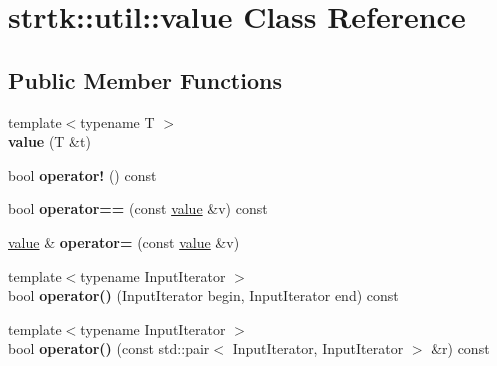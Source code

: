 \hypertarget{classstrtk_1_1util_1_1value}{\section{strtk\-:\-:util\-:\-:value Class Reference}
\label{classstrtk_1_1util_1_1value}
}
\subsection*{Public Member Functions}
\begin{DoxyCompactItemize}
\item 
\hypertarget{classstrtk_1_1util_1_1value_aac3439c6aac530d2678c2c5b251bed77}{{\footnotesize template$<$typename T $>$ }\\{\bfseries value} (T \&t)}\label{classstrtk_1_1util_1_1value_aac3439c6aac530d2678c2c5b251bed77}

\item 
\hypertarget{classstrtk_1_1util_1_1value_ad161a80cc18c6b1413118c459f43dc67}{bool {\bfseries operator!} () const }\label{classstrtk_1_1util_1_1value_ad161a80cc18c6b1413118c459f43dc67}

\item 
\hypertarget{classstrtk_1_1util_1_1value_a380152f1c6ad8790c7996181e52ed8dc}{bool {\bfseries operator==} (const \hyperlink{classstrtk_1_1util_1_1value}{value} \&v) const }\label{classstrtk_1_1util_1_1value_a380152f1c6ad8790c7996181e52ed8dc}

\item 
\hypertarget{classstrtk_1_1util_1_1value_ab0ca2a6e48dfdb638cbbc6bbb9b5e009}{\hyperlink{classstrtk_1_1util_1_1value}{value} \& {\bfseries operator=} (const \hyperlink{classstrtk_1_1util_1_1value}{value} \&v)}\label{classstrtk_1_1util_1_1value_ab0ca2a6e48dfdb638cbbc6bbb9b5e009}

\item 
\hypertarget{classstrtk_1_1util_1_1value_a05359a3121627ef019682b620e3ad5f2}{{\footnotesize template$<$typename Input\-Iterator $>$ }\\bool {\bfseries operator()} (Input\-Iterator begin, Input\-Iterator end) const }\label{classstrtk_1_1util_1_1value_a05359a3121627ef019682b620e3ad5f2}

\item 
\hypertarget{classstrtk_1_1util_1_1value_a096010cbccd86b6f9169285b70469db3}{{\footnotesize template$<$typename Input\-Iterator $>$ }\\bool {\bfseries operator()} (const std\-::pair$<$ Input\-Iterator, Input\-Iterator $>$ \&r) const }\label{classstrtk_1_1util_1_1value_a096010cbccd86b6f9169285b70469db3}


\end{DoxyCompactItemize}
